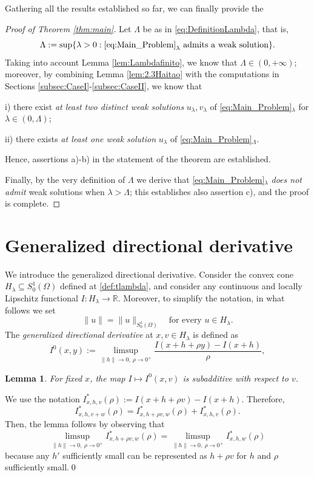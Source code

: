 \documentclass[11pt]{amsart}
\numberwithin{equation}{section} %
\newtheorem{lemma}[teo]{Lemma}
\theoremstyle{definition}
\def\R{\mathbb{R}}
\newcommand{\cor}{\textit}
\newcommand{\fine}{\qed\newline}
\begin{document}
Gathering all the results established so far, we can finally provide the
\begin{proof}[Proof of Theorem \ref{thm:main}]
	Let $\Lambda$ be as in \eqref{eq:DefinitionLambda}, that is, 
    $$\Lambda := \sup \{ \lambda >0: \eqref{eq:Main_Problem}_\lambda \textrm{ admits a weak solution}\}.$$
    Taking into account Lemma \ref{lem:Lambdafinito}, we know that $\Lambda\in (0,+\infty)$; moreover,
    by combining Lemma \ref{lem:2.3Haitao} with the 
    computations in Sections \ref{subsec:CaseI}-\ref{subsec:CaseII}, we know that
    \vspace*{0.1cm}
    
    i)\,\,there exist \emph{at least two distinct weak solutions} $u_\lambda,v_\lambda$ of
    \eqref{eq:Main_Problem}$_\lambda$ for $\lambda\in(0,\Lambda)$;
    
    ii)\,\,there exists \emph{at least one weak solution} $u_\lambda$ of
    \eqref{eq:Main_Problem}$_\Lambda$.
    \vspace*{0.1cm}
    
    \noindent Hence, assertions a)-b) in the statement of the theorem are established. 
    
    Finally,
    by the very definition of $\Lambda$ we derive that \eqref{eq:Main_Problem}$_\lambda$
    \emph{does not admit} weak solutions when $\lambda > \Lambda$; this establishes also
    assertion c), and the proof is complete.
\end{proof}

\appendix
\section{Generalized directional derivative}\label{app:gdd}

We introduce the generalized directional derivative. Consider
the {convex cone $H_\lambda\subseteq S_0^1(\Omega)$} defined
at \eqref{def:tlambda}, and
consider any continuous and locally Lipschitz functional $I\colon {H_\lambda}\to \R$.
Moreover, to simplify the notation, in what follows we set
$$\|u\| = \|u\|_{S_0^1(\Omega)}\quad \text{for every $u\in H_\lambda$}.$$
The \cor{generalized directional derivative} at 
{$x,v\in H_\lambda$} is defined as
\begin{equation}\label{def:gdd}
	I^0(x,y):=\limsup_{\|h\|\to0,\ \rho\to0^+}\frac{I(x+h+\rho y)-I(x+h)}{\rho},
\end{equation}
\begin{lemma}\label{lem:subadd}
	For fixed $x$, the map $I\mapsto I^0(x,v)$ is subadditive with respect to $v$.
\end{lemma}
\proof
We use the notation $I^*_{x,h,v}(\rho):=I(x+h+\rho v)-I(x+h)$.
Therefore,
\[
I^*_{x,h,v+w}(\rho)=I^*_{x,h+\rho v,w}(\rho)+I^*_{x,h,v}(\rho).
\]
Then, the lemma follows by observing that 
\[
\limsup_{\|h\|\to0,\ \rho\to0^+}I^*_{x,h+\rho v,w}(\rho)=\limsup_{\|h\|\to0,\ \rho\to0^+}I^*_{x,h,w}(\rho)
\]
because any $h'$ sufficiently small can be represented
as $h+\rho v$ for $h$ and $\rho$ sufficiently small.\fine
\end{document}
